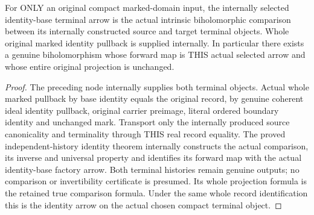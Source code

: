 \begin{theorem}
\label{hir:smooth-original-compact-identity-terminal-arrow}
\leanok
{}
For ONLY an original compact marked-domain input, the internally selected
identity-base terminal arrow is the actual intrinsic biholomorphic comparison
between its internally constructed source and target terminal objects.
Whole original marked identity pullback is supplied internally. In particular
there exists a genuine biholomorphism whose forward map is THIS actual
selected arrow and whose entire original projection is unchanged.
\end{theorem}
\begin{proof}
The preceding node internally supplies both terminal objects. Actual whole
marked pullback by base identity equals the original record, by genuine
coherent ideal identity pullback, original carrier preimage, literal ordered
boundary identity and unchanged mark. Transport only the internally produced
source canonicality and terminality through THIS real record equality.
The proved independent-history identity theorem internally constructs the
actual comparison, its inverse and universal property and identifies its
forward map with the actual identity-base factory arrow. Both terminal
histories remain genuine outputs; no comparison or invertibility certificate
is presumed. Its whole projection formula is the retained true comparison
formula. Under the same whole record identification this is the identity
arrow on the actual chosen compact terminal object.
\end{proof}

